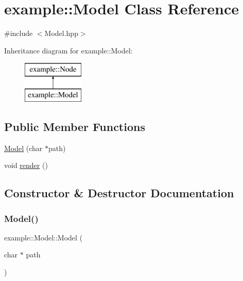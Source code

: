 \hypertarget{classexample_1_1_model}{}\section{example\+:\+:Model Class Reference}
\label{classexample_1_1_model}


{\ttfamily \#include $<$Model.\+hpp$>$}

Inheritance diagram for example\+:\+:Model\+:\begin{figure}[H]
\begin{center}
\leavevmode
\includegraphics[height=2.000000cm]{classexample_1_1_model}
\end{center}
\end{figure}
\subsection*{Public Member Functions}
\begin{DoxyCompactItemize}
\item 
\mbox{\hyperlink{classexample_1_1_model_a0e1e9b91041e92ab9c45c5297a5c7a7a}{Model}} (char $\ast$path)
\item 
void \mbox{\hyperlink{classexample_1_1_model_ade64225bbb0381bbd5a8dddeac81d983}{render}} ()
\end{DoxyCompactItemize}


\subsection{Constructor \& Destructor Documentation}
\mbox{\label{classexample_1_1_model_a0e1e9b91041e92ab9c45c5297a5c7a7a}} 
\subsubsection{\texorpdfstring{Model()}{Model()}}
{\footnotesize\ttfamily example\+::\+Model\+::\+Model (\begin{DoxyParamCaption}\item[{char $\ast$}]{path }\end{DoxyParamCaption})\hspace{0.3cm}{\ttfamily [inline]}}



